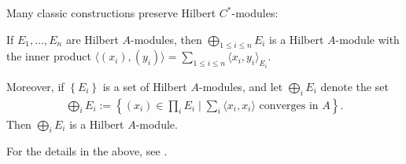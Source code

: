 Many classic constructions preserve Hilbert $C^*$-modules:
\begin{example}
	If $E_1,\dots,E_n$ are Hilbert $A$-modules, then $\bigoplus_{1 \leq i \leq n} E_i$ is a Hilbert $A$-module with the inner product $\langle (x_i),(y_i)\rangle = \sum_{1 \leq i \leq n} \langle x_i,y_i\rangle_{E_i}$. 

	Moreover, if $\left\{ E_i \right\}$ is a set of Hilbert $A$-modules, and let $\bigoplus_i E_i$ denote the set
	\begin{align*}
		\bigoplus_i E_i := \left\{ (x_i) \in \prod_i E_i \mid \sum_{i} \langle x_i,x_i\rangle \text{ converges in } A \right\}.
	\end{align*}
	Then $\bigoplus_i E_i$ is a Hilbert $A$-module. 
\end{example}
For the details in the above, see \cite[5]{lance1995hilbert}.

